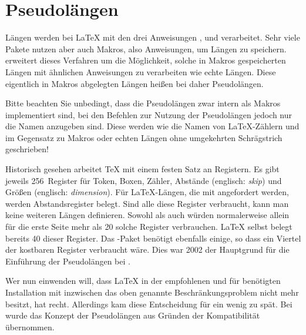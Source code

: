 \section{Pseudolängen}
\BeginIndexGroup
{}

Längen werden bei \LaTeX{} mit den drei Anweisungen
, 
und  verarbeitet. Sehr viele Pakete
nutzen aber auch Makros, also Anweisungen, um Längen zu
speichern. \KOMAScript{} erweitert dieses Verfahren um die Möglichkeit, solche
in Makros gespeicherten Längen mit ähnlichen Anweisungen zu verarbeiten wie
echte Längen. Diese eigentlich in Makros abgelegten Längen heißen bei
\KOMAScript{} daher Pseudolängen.

Bitte beachten Sie unbedingt, dass die Pseudolängen zwar
intern als Makros implementiert sind, bei den Befehlen zur Nutzung der
Pseudolängen jedoch nur die Namen anzugeben sind. Diese werden wie die Namen
von \LaTeX-Zählern und im Gegensatz zu Makros oder echten Längen ohne
umgekehrten Schrägstrich geschrieben!

\begin{Explain}
  Historisch gesehen arbeitet \TeX{} mit einem festen Satz an Registern. Es
  gibt jeweils 256~Register für Token, Boxen, Zähler, Abstände (englisch:
  \emph{skip}) und Größen (englisch: \emph{dimension}). Für \LaTeX{}-Längen,
  die mit  angefordert werden, werden Abstandsregister
  belegt. Sind alle diese Register verbraucht, kann man keine weiteren Längen
  definieren. Sowohl  als auch  würden
  normalerweise allein für die erste Seite mehr als 20 solche Register
  verbrauchen. \LaTeX{} selbst belegt bereits 40 dieser Register. Das
  \hyperref[cha:typearea]{}%
  -Paket benötigt ebenfalls einige, so dass ein Viertel
  der kostbaren Register verbraucht wäre. Dies war 2002 der Hauptgrund für die
  Einführung der Pseudolängen bei .

  Wer nun einwenden will, dass \LaTeX{} in der empfohlenen und für
  \KOMAScript{} benötigten Installation mit \eTeX{} inzwischen das oben
  genannte Beschränkungsproblem nicht mehr besitzt, hat recht. Allerdings kam
  diese Entscheidung für  ein wenig zu spät. Bei
   wurde das Konzept der Pseudolängen aus Gründen der
  Kompatibilität übernommen.
\end{Explain}

